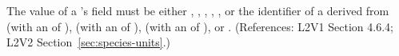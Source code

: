The value of a \Species's  field must be either
, , , ,
, or the identifier of a \UnitDefinition derived from
 (with an  of ), 
(with an  of ),  (with an
 of ), or .  (References:
L2V1 Section 4.6.4; L2V2 Section~\ref{sec:species-units}.)
